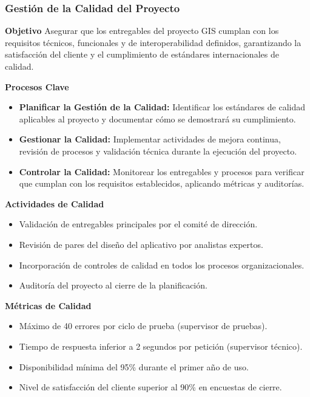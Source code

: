     \subsubsection{Gestión de la Calidad del Proyecto}
      \begin{multicols}{2}
        \textbf{Objetivo}
Asegurar que los entregables del proyecto GIS cumplan con los requisitos técnicos, funcionales y de interoperabilidad definidos, garantizando la satisfacción del cliente y el cumplimiento de estándares internacionales de calidad.

\textbf{Procesos Clave}
\begin{itemize}
    \item \textbf{Planificar la Gestión de la Calidad:} Identificar los estándares de calidad aplicables al proyecto y documentar cómo se demostrará su cumplimiento.
    \item \textbf{Gestionar la Calidad:} Implementar actividades de mejora continua, revisión de procesos y validación técnica durante la ejecución del proyecto.
    \item \textbf{Controlar la Calidad:} Monitorear los entregables y procesos para verificar que cumplan con los requisitos establecidos, aplicando métricas y auditorías.
\end{itemize}

\textbf{Actividades de Calidad}
\begin{itemize}
    \item Validación de entregables principales por el comité de dirección.
    \item Revisión de pares del diseño del aplicativo por analistas expertos.
    \item Incorporación de controles de calidad en todos los procesos organizacionales.
    \item Auditoría del proyecto al cierre de la planificación.
\end{itemize}

\textbf{Métricas de Calidad}
\begin{itemize}
    \item Máximo de 40 errores por ciclo de prueba (supervisor de pruebas).
    \item Tiempo de respuesta inferior a 2 segundos por petición (supervisor técnico).
    \item Disponibilidad mínima del 95\% durante el primer año de uso.
    \item Nivel de satisfacción del cliente superior al 90\% en encuestas de cierre.
\end{itemize}


\end{multicols}

